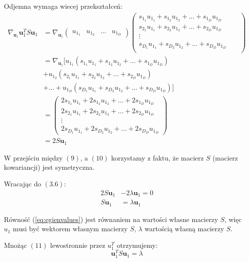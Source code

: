 \documentclass[oneside, eng]{mgr}
\newcommand{\bb}{\textbf}
\begin{document}
Odjemna wymaga wiecej przekształceń:
\begin{align}
	\nabla_{\bb{u}_1} \bb{u}_1^T S \bb{u}_1 
	&= \nabla_{\bb{u}_1} 
	\left( \begin{array}{llll} u_{1_1} & u_{1_2} & ... & u_{1_D} \end{array} \right)
	\begin{pmatrix}
         s_{1_1} u_{1_1} + s_{1_2} u_{1_2} + ... + s_{1_D} u_{1_D}  \\
		 s_{2_1} u_{1_1} + s_{2_2} u_{1_2} + ... + s_{2_D} u_{1_D} && \\
		 \vdots     \\
		 s_{D_1} u_{1_1} + s_{D_2} u_{1_2} + ... + s_{D_D} u_{1_D} && \\
    \end{pmatrix} \\
    &= \nabla_{\bb{u}_1} [u_{1_1} (s_{1_1} u_{1_1} + s_{1_2} u_{1_2} + ... + s_{1_D} u_{1_D})  \\
    				&+ u_{1_2} (s_{2_1} u_{1_1} + s_{2_2} u_{1_2} + ... + s_{2_D} u_{1_D}) \nonumber \\
    				&+ ... + u_{1_D} (s_{D_1} u_{1_1} + s_{D_2} u_{1_2} + ... + s_{D_D} u_{1_D})] \nonumber \\
    &= \begin{pmatrix}
    	2 s_{1_1} u_{1_1} + 2 s_{1_2} u_{1_2} + ... + 2 s_{1_D} u_{1_D}  \\
    	2 s_{2_1} u_{1_1} + 2 s_{2_2} u_{1_2} + ... + 2 s_{2_D} u_{1_D}  \\
    	\vdots     \\
	    2 s_{D_1} u_{1_1} + 2 s_{D_2} u_{1_2} + ... + 2 s_{D_D} u_{1_D}
    \end{pmatrix} \\
    &= 2 S \bb{u}_1
\end{align}

W przejściu między $(9)$, a $(10)$ korzystamy z faktu, że macierz $S$ (macierz kowariancji) jest symetryczna.

Wracając do $(3.6)$:
\begin{align} \label{eq:egienvalues}
	2 S \bb{u}_1 &- 2 \lambda \bb{u}_1 = 0	\nonumber \\
	S \bb{u}_1 &= \lambda \bb{u}_1 
\end{align}

Równość (\ref{eq:egienvalues}) jest równaniem na wartości własne macierzy $S$, więc $u_1$ musi być wektorem własnym macierzy $S$, $\lambda$ wartością własną macierzy $S$.

Mnożąc $(11)$ lewostronnie przez $u_1^T$ otrzymujemy:
\begin{equation} \label{eq:var_lambda}
	\bb{u}_1^T S \bb{u}_1 = \lambda
\end{equation}
\end{document}
